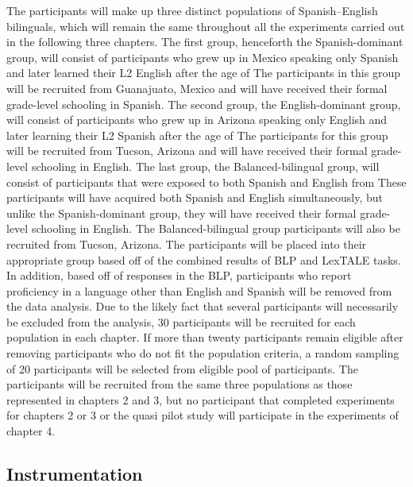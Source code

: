 The participants will make up three distinct populations of Spanish–English bilinguals, which will remain the same throughout all the experiments carried out in the following three chapters. The first group, henceforth the Spanish-dominant group, will consist of participants who grew up in Mexico speaking only Spanish and later learned their L2 English after the age of %
The participants in this group will be recruited from Guanajuato, Mexico and will have received their formal grade-level schooling in Spanish. The second group, the English-dominant group, will consist of participants who grew up in Arizona speaking only English and later learning their L2 Spanish after the age of %
The participants for this group will be recruited from Tucson, Arizona and will have received their formal grade-level schooling in English. The last group, the Balanced-bilingual group, will consist of participants that were exposed to both Spanish and English from %
These participants will have acquired both Spanish and English simultaneously, but unlike the Spanish-dominant group, they will have received their formal grade-level schooling in English. The Balanced-bilingual %
group participants will also be recruited from Tucson, Arizona. The participants will be placed into their appropriate group based off of the combined results of BLP and LexTALE tasks. In addition, based off of responses in the BLP, participants who report proficiency in a language other than English and Spanish will be removed from the data analysis. Due to the likely fact that several participants will necessarily be excluded from the analysis, 30 participants will be recruited for each population in each chapter. If more than twenty participants remain eligible after removing participants who do not fit the population criteria, a random sampling of 20 participants will be selected from eligible pool of participants. The participants will be recruited from the same three populations as those represented in chapters 2 and 3, but no participant that completed experiments for chapters 2 or 3 or the quasi pilot study will participate in the experiments of chapter 4. 

\subsection{Instrumentation}

